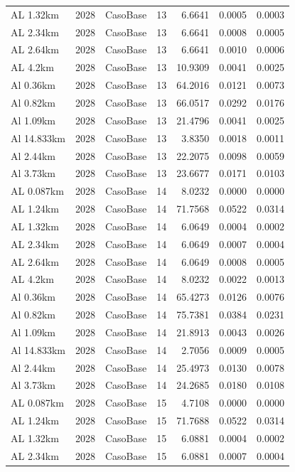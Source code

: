 \documentclass[11pt,a4paper]{article}
\begin{document}
\begin{longtable}{llllrrr}
AL 1.32km & 2028 & CasoBase & 13 & 6.6641 & 0.0005 & 0.0003 \\
AL 2.34km & 2028 & CasoBase & 13 & 6.6641 & 0.0008 & 0.0005 \\
AL 2.64km & 2028 & CasoBase & 13 & 6.6641 & 0.0010 & 0.0006 \\
AL 4.2km & 2028 & CasoBase & 13 & 10.9309 & 0.0041 & 0.0025 \\
Al 0.36km & 2028 & CasoBase & 13 & 64.2016 & 0.0121 & 0.0073 \\
Al 0.82km & 2028 & CasoBase & 13 & 66.0517 & 0.0292 & 0.0176 \\
Al 1.09km & 2028 & CasoBase & 13 & 21.4796 & 0.0041 & 0.0025 \\
Al 14.833km & 2028 & CasoBase & 13 & 3.8350 & 0.0018 & 0.0011 \\
Al 2.44km & 2028 & CasoBase & 13 & 22.2075 & 0.0098 & 0.0059 \\
Al 3.73km & 2028 & CasoBase & 13 & 23.6677 & 0.0171 & 0.0103 \\
AL 0.087km & 2028 & CasoBase & 14 & 8.0232 & 0.0000 & 0.0000 \\
AL 1.24km & 2028 & CasoBase & 14 & 71.7568 & 0.0522 & 0.0314 \\
AL 1.32km & 2028 & CasoBase & 14 & 6.0649 & 0.0004 & 0.0002 \\
AL 2.34km & 2028 & CasoBase & 14 & 6.0649 & 0.0007 & 0.0004 \\
AL 2.64km & 2028 & CasoBase & 14 & 6.0649 & 0.0008 & 0.0005 \\
AL 4.2km & 2028 & CasoBase & 14 & 8.0232 & 0.0022 & 0.0013 \\
Al 0.36km & 2028 & CasoBase & 14 & 65.4273 & 0.0126 & 0.0076 \\
Al 0.82km & 2028 & CasoBase & 14 & 75.7381 & 0.0384 & 0.0231 \\
Al 1.09km & 2028 & CasoBase & 14 & 21.8913 & 0.0043 & 0.0026 \\
Al 14.833km & 2028 & CasoBase & 14 & 2.7056 & 0.0009 & 0.0005 \\
Al 2.44km & 2028 & CasoBase & 14 & 25.4973 & 0.0130 & 0.0078 \\
Al 3.73km & 2028 & CasoBase & 14 & 24.2685 & 0.0180 & 0.0108 \\
AL 0.087km & 2028 & CasoBase & 15 & 4.7108 & 0.0000 & 0.0000 \\
AL 1.24km & 2028 & CasoBase & 15 & 71.7688 & 0.0522 & 0.0314 \\
AL 1.32km & 2028 & CasoBase & 15 & 6.0881 & 0.0004 & 0.0002 \\
AL 2.34km & 2028 & CasoBase & 15 & 6.0881 & 0.0007 & 0.0004 \\

\end{longtable}
\end{document}
